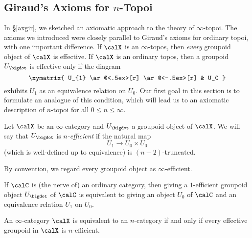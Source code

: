 \subsection{Giraud's Axioms for $n$-Topoi}\label{provengiraud}

In \S \ref{axgir}, we sketched an axiomatic approach to the theory of $\infty$-topoi. The axioms
we introduced were closely parallel to Giraud's axioms for ordinary topoi, with one important difference. If $\calX$ is an $\infty$-topos, then {\em every} groupoid object of $\calX$ is effective. If $\calX$ is an ordinary topos, then a groupoid $U_{\bigdot}$ is effective only if the diagram
$$\xymatrix{ U_{1} \ar@<.5ex>[r] \ar@<-.5ex>[r] & U_0 }$$
exhibits $U_{1}$ as an equivalence relation on $U_0$. Our first goal in this section is to formulate an analogue of this condition, which will lead us to an axiomatic description of $n$-topoi for all
$0 \leq n \leq \infty$.

\begin{definition}
Let $\calX$ be an $\infty$-category and $U_{\bigdot}$ a groupoid object of $\calX$. We will say that
$U_{\bigdot}$ is {\it $n$-efficient} if the natural map $$ U_{1} \rightarrow U_0 \times U_0 $$
(which is well-defined up to equivalence) is $(n-2)$-truncated.
\end{definition}

\begin{remark}
By convention, we regard every groupoid object as $\infty$-efficient.
\end{remark}

\begin{example}
If $\calC$ is (the nerve of) an ordinary category, then giving a $1$-efficient groupoid object $U_{\bigdot}$ of $\calC$ is equivalent to giving an object $U_0$ of $\calC$ and an equivalence relation $U_1$ on $U_0$.
\end{example}

\begin{proposition}\label{storage}
An $\infty$-category $\calX$ is equivalent to an $n$-category if and only if every
effective groupoid in $\calX$ is $n$-efficient.
\end{proposition}

